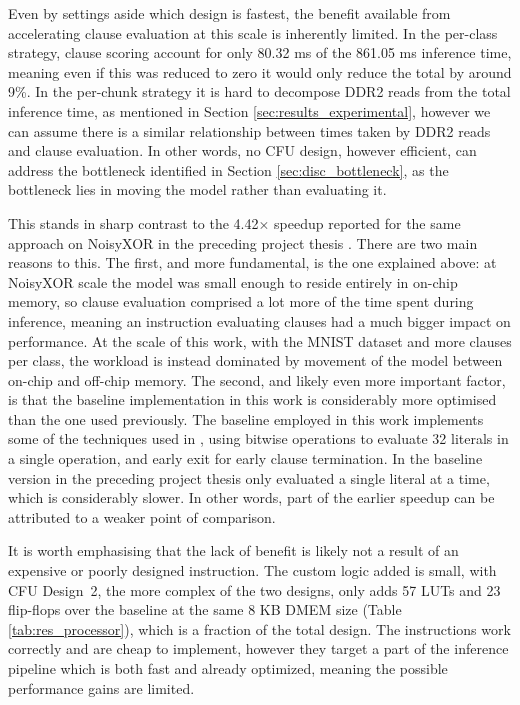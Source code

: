 Even by settings aside which design is fastest, the benefit available from accelerating clause evaluation at this scale is inherently limited. In the per-class strategy, clause scoring account for only 80.32 ms of the 861.05 ms inference time, meaning even if this was reduced to zero it would only reduce the total by around 9\%. In the per-chunk strategy it is hard to decompose DDR2 reads from the total inference time, as mentioned in Section \ref{sec:results_experimental}, however we can assume there is a similar relationship between times taken by DDR2 reads and clause evaluation. In other words, no CFU design, however efficient, can address the bottleneck identified in Section \ref{sec:disc_bottleneck}, as the bottleneck lies in moving the model rather than evaluating it.

This stands in sharp contrast to the 4.42$\times$ speedup reported for the same approach on NoisyXOR in the preceding project thesis \cite{JB2025}. There are two main reasons to this. The first, and more fundamental, is the one explained above: at NoisyXOR scale the model was small enough to reside entirely in on-chip memory, so clause evaluation comprised a lot more of the time spent during inference, meaning an instruction evaluating clauses had a much bigger impact on performance. At the scale of this work, with the MNIST dataset and more clauses per class, the workload is instead dominated by movement of the model between on-chip and off-chip memory. The second, and likely even more important factor, is that the baseline implementation in this work is considerably more optimised than the one used previously. The baseline employed in this work implements some of the techniques used in \cite{zeng2025fastcompacttsetlinmachine}, using bitwise operations to evaluate 32 literals in a single operation, and early exit for early clause termination. In the baseline version in the preceding project thesis only evaluated a single literal at a time, which is considerably slower. In other words, part of the earlier speedup can be attributed to a weaker point of comparison.

It is worth emphasising that the lack of benefit is likely not a result of an expensive or poorly designed instruction. The custom logic added is small, with CFU Design~2, the more complex of the two designs, only adds 57 LUTs and 23 flip-flops over the baseline at the same 8 KB DMEM size (Table \ref{tab:res_processor}), which is a fraction of the total design. The instructions work correctly and are cheap to implement, however they target a part of the inference pipeline which is both fast and already optimized, meaning the possible performance gains are limited.




